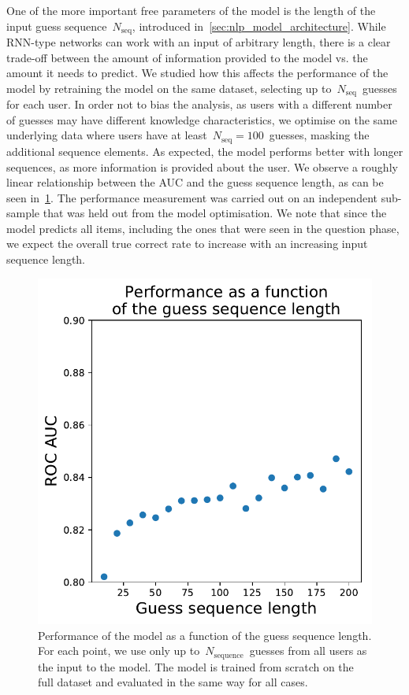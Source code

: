 One of the more important free parameters of the model is the length of the input guess sequence~$N_{\mathrm{seq}}$, introduced in~\cref{sec:nlp_model_architecture}. While RNN-type networks can work with an input of arbitrary length, there is a clear trade-off between the amount of information provided to the model vs. the amount it needs to predict.
We studied how this affects the performance of the model by retraining the model on the same dataset, selecting up to~$N_{\mathrm{seq}}$~guesses for each user. In order not to bias the analysis, as users with a different number of guesses may have different knowledge characteristics, we optimise on the same underlying data where users have at least~$N_{\mathrm{seq}} = 100$~guesses, masking the additional sequence elements. As expected, the model performs better with longer sequences, as more information is provided about the user. We observe a roughly linear relationship between the AUC and the guess sequence length, as can be seen in~\cref{fig:seq_length}. The performance measurement was carried out on an independent sub-sample that was held out from the model optimisation. We note that since the model predicts all items, including the ones that were seen in the question phase, we expect the overall true correct rate to increase with an increasing input sequence length.

\begin{figure}[ht]
\centering
\includegraphics[width=0.5\linewidth]{figures/lingvist/seq_length.pdf}
\caption[Performance as a function of sequence length]{Performance of the model as a function of the guess sequence length. For each point, we use only up to~$N_{\mathrm{sequence}}$~guesses from all users as the input to the model. The model is trained from scratch on the full dataset and evaluated in the same way for all cases.} 
\label{fig:seq_length} 
\end{figure} 

